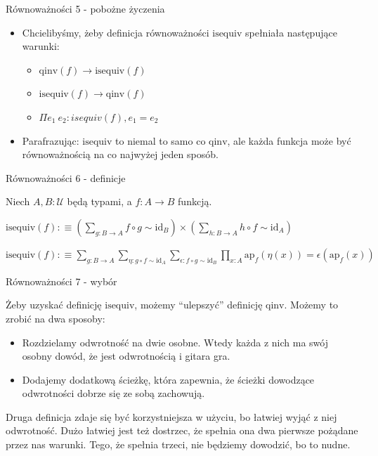 \documentclass{beamer}
\newcommand{\U}{\mathcal{U}}
\newcommand{\ap}[2]{\text{ap}_{#1}(#2)}
\newcommand{\qinv}{\text{qinv}}
\newcommand{\isequiv}{\text{isequiv}}
\newcommand{\id}{\text{id}}
\newcommand{\comp}{\circ}
\begin{document}
\begin{frame}{Równoważności 5 - pobożne życzenia}
\begin{itemize}
	\item Chcielibyśmy, żeby definicja równoważności $\isequiv$ spełniała następujące warunki:
	\begin{itemize}
		\item $\qinv(f) \to \isequiv(f)$
		\item $\isequiv(f) \to \qinv(f)$
		\item $\Pi e_1\ e_2 : isequiv(f), e_1 = e_2$
	\end{itemize}
	\item Parafrazując: $\isequiv$ to niemal to samo co $\qinv$, ale każda funkcja może być równoważnością na co najwyżej jeden sposób.
\end{itemize}
\end{frame}

\begin{frame}{Równoważności 6 - definicje}

Niech $A, B : \U$ będą typami, a $f : A \to B$ funkcją.

\begin{definition}[Równoważność 1]
$
\displaystyle
	\isequiv(f) :\equiv
		\left(\sum_{g : B \to A} f \comp g \sim \id_B\right) \times
		\left(\sum_{h : B \to A} h \comp f \sim \id_A\right)
$
\end{definition}

\begin{definition}[Równoważność 2]
$
\displaystyle
	\isequiv(f) :\equiv
		\sum_{g : B \to A} \sum_{\eta : g \comp f \sim \id_A} \sum_{\epsilon : f \comp g \sim \id_B}
			\prod_{x : A} \ap{f}{\eta(x)} = \epsilon(\ap{f}{x})
$
\end{definition}

\end{frame}


\begin{frame}{Równoważności 7 - wybór}

Żeby uzyskać definicję $\isequiv$, możemy ``ulepszyć'' definicję $\qinv$. Możemy to zrobić na dwa sposoby:

\begin{itemize}
	\item Rozdzielamy odwrotność na dwie osobne. Wtedy każda z nich ma swój osobny dowód, że jest odwrotnością i gitara gra.
	\item Dodajemy dodatkową ścieżkę, która zapewnia, że ścieżki dowodzące odwrotności dobrze się ze sobą zachowują.
\end{itemize}

Druga definicja zdaje się być korzystniejsza w użyciu, bo łatwiej wyjąć z niej odwrotność. Dużo łatwiej jest też dostrzec, że spełnia ona dwa pierwsze pożądane przez nas warunki. Tego, że spełnia trzeci, nie będziemy dowodzić, bo to nudne.

\end{frame}
\end{document}
